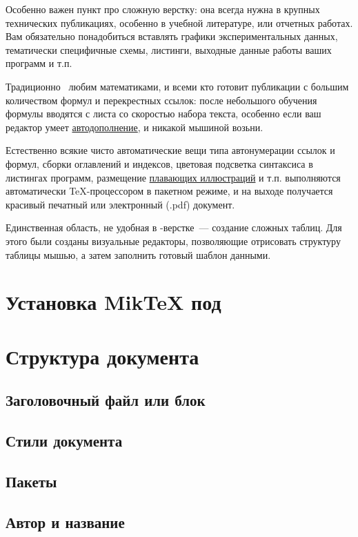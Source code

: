 Особенно важен пункт про сложную верстку: она всегда нужна в крупных технических
публикациях, особенно в учебной литературе, или отчетных работах. Вам
обязательно понадобиться вставлять графики экспериментальных данных, тематически
специфичные схемы, листинги, выходные данные работы ваших программ и т.п.

Традиционно \latex\ любим математиками, и всеми кто готовит публикации с большим
количеством формул и перекрестных ссылок: после небольшого обучения формулы
вводятся с листа со скоростью набора текста, особенно если ваш редактор умеет
\hyperref[autocomplition]{автодополнение}, и никакой мышиной возьни.

Естественно всякие чисто автоматические вещи типа автонумерации ссылок и формул,
сборки оглавлений и индексов, цветовая подсветка синтаксиса в листингах
программ, размещение \hyperref[floatfig]{плавающих иллюстраций} и т.п.
выполняются автоматически \TeX-процессором в пакетном режиме, и на выходе
получается красивый печатный или электронный (.pdf) документ.

Единственная область, не удобная в \latex-верстке\ --- создание сложных таблиц.
Для этого были созданы визуальные редакторы, позволяющие отрисовать структуру
таблицы мышью, а затем заполнить готовый шаблон данными.

\section{Установка MikTeX под \win}


\section{Структура документа}
\subsection{Заголовочный файл или блок}
\subsection{Стили документа}
\subsection{Пакеты}
\subsection{Автор и название}
